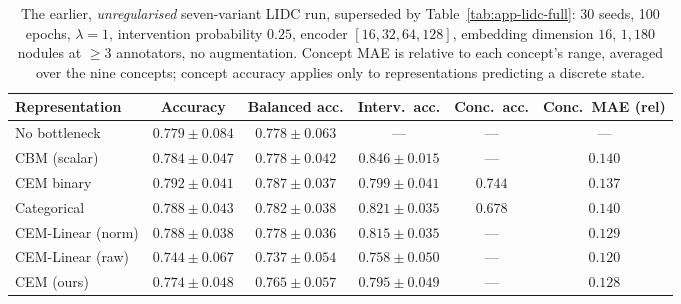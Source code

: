 \documentclass[11pt]{article}
\begin{document}
\begin{table}[h]
\centering
\caption{The earlier, \emph{unregularised} seven-variant LIDC run, superseded by Table~\ref{tab:app-lidc-full}: 30 seeds, 100 epochs,
$\lambda = 1$, intervention probability $0.25$, encoder $[16,32,64,128]$,
embedding dimension $16$, $1{,}180$ nodules at $\geq 3$ annotators, no
augmentation. Concept MAE is relative to each concept's range, averaged over
the nine concepts; concept accuracy applies only to representations predicting
a discrete state.}
\label{tab:app-lidc-unreg}
\begin{tabular}{lccccc}
\toprule
\textbf{Representation} & \textbf{Accuracy} & \textbf{Balanced acc.} &
\textbf{Interv.\ acc.} & \textbf{Conc.\ acc.} & \textbf{Conc.\ MAE (rel)} \\
\midrule
No bottleneck    & $0.779 \pm 0.084$ & $0.778 \pm 0.063$ & --- & --- & --- \\
CBM (scalar)     & $0.784 \pm 0.047$ & $0.778 \pm 0.042$ & $\mathbf{0.846 \pm 0.015}$ & --- & $0.140$ \\
CEM binary       & $\mathbf{0.792 \pm 0.041}$ & $\mathbf{0.787 \pm 0.037}$ & $0.799 \pm 0.041$ & $0.744$ & $0.137$ \\
Categorical      & $0.788 \pm 0.043$ & $0.782 \pm 0.038$ & $0.821 \pm 0.035$ & $0.678$ & $0.140$ \\
CEM-Linear (norm)& $0.788 \pm 0.038$ & $0.778 \pm 0.036$ & $0.815 \pm 0.035$ & --- & $0.129$ \\
CEM-Linear (raw) & $0.744 \pm 0.067$ & $0.737 \pm 0.054$ & $0.758 \pm 0.050$ & --- & $\mathbf{0.120}$ \\
CEM (ours)       & $0.774 \pm 0.048$ & $0.765 \pm 0.057$ & $0.795 \pm 0.049$ & --- & $0.128$ \\
\bottomrule
\end{tabular}
\end{table}
\end{document}
